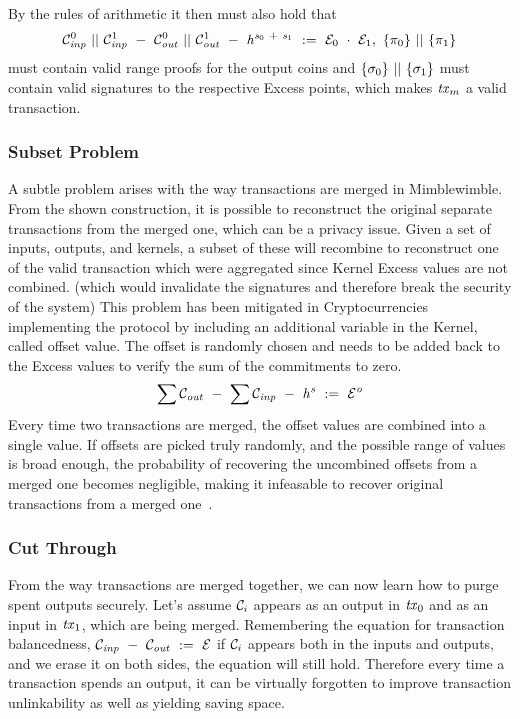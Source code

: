 By the rules of arithmetic it then must also hold that
\[ \mathcal{C}_{\mathit{inp}}^0 ~||~ \mathcal{C}_{\mathit{inp}}^1 ~-~ \mathcal{C}_{\mathit{out}}^0 ~||~ \mathcal{C}_{\mathit{out}}^1 ~-~ \mathit{h}^{\mathit{s}_0 ~+~ \mathit{s}_1} ~:=~ \mathcal{E}_0 ~\cdot~ \mathcal{E}_1 ,~ \{\pi_0\} ~||~ \{\pi_1\} \]
must contain valid range proofs for the output coins and $\{\sigma_0\} ~||~ \{\sigma_1\}$ must contain valid signatures to the respective Excess points, which makes $\mathit{tx}_m$ a valid transaction.

\subsubsection{Subset Problem}
A subtle problem arises with the way transactions are merged in Mimblewimble. From the shown construction, it is possible to reconstruct the original separate transactions from the merged one,
which can be a privacy issue. Given a set of inputs, outputs, and kernels, a subset of these will recombine to reconstruct one of the valid transaction which were aggregated since Kernel Excess values are not combined.
(which would invalidate the signatures and therefore break the security of the system) This problem has been mitigated in Cryptocurrencies implementing the protocol by including an
additional variable in the Kernel, called offset value. The offset is randomly chosen and needs to be added back to the Excess values to verify the sum of the commitments to zero.
\[ \sum{\mathcal{C}_{\mathit{out}}} ~-~ \sum\mathcal{C}_{\mathit{inp}} ~-~ \mathit{h}^{\mathit{s}} ~:=~ \mathcal{E}^{\mathit{o}} \]
Every time two transactions are merged, the offset values are combined into a single value. If offsets are picked truly randomly, and the possible range of values is broad enough, the probability of recovering the
uncombined offsets from a merged one becomes negligible, making it infeasable to recover original transactions from a merged one~\cite{poelstra2016mimblewimble}.



\subsubsection{Cut Through}
From the way transactions are merged together, we can now learn how to purge spent outputs securely. Let's assume $\mathcal{C}_i$ appears as an output in $\mathit{tx}_0$ and as an input in $\mathit{tx}_1$,
which are being merged. Remembering the equation for transaction balancedness, $\mathcal{C}_{\mathit{inp}} ~-~ \mathcal{C}_{\mathit{out}} ~:=~ \mathcal{E}$ if $\mathcal{C}_i$ appears both in the inputs and outputs, and we erase it on both sides, the equation will still hold.
Therefore every time a transaction spends an output, it can be virtually forgotten to improve transaction unlinkability as well as yielding saving space.

